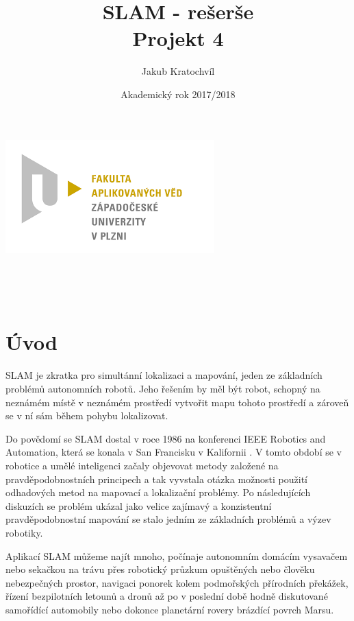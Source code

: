 \documentclass[12pt,a4paper]{article}
\begin{document}
\title{SLAM - rešerše \\ Projekt 4}
\author{Jakub Kratochvíl}
\date{Akademický rok 2017/2018}
\begin{titlepage}
\begin{center}
\includegraphics[scale=0.5]{img/logo_zcu.png}\\
\vspace{5cm}
\begin{Large}
\textbf{\thetitle}\\
\end{Large}
\vspace{3cm}
\theauthor\\
\vspace{5cm}
\thedate
\end{center}
\end{titlepage}
\newpage
		
		
\tableofcontents
\newpage
\fontsize{12pt}{18pt}\selectfont


\section{Úvod}
SLAM je zkratka pro simultánní lokalizaci a mapování, jeden ze základních problémů autonomních robotů. Jeho řešením by měl být robot, schopný na neznámém místě v neznámém prostředí vytvořit mapu tohoto prostředí a zároveň se v ní sám během pohybu lokalizovat.

Do povědomí se SLAM dostal v roce 1986 na konferenci IEEE Robotics and Automation, která se konala v San Francisku v Kalifornii \cite{Durrant-Whyte}. V tomto období se v robotice a umělé inteligenci začaly objevovat metody založené na pravděpodobnostních principech a tak vyvstala otázka možnosti použití odhadových metod na mapovací a lokalizační problémy. Po následujících diskuzích se problém ukázal jako velice zajímavý a konzistentní pravděpodobnostní mapování se stalo jedním ze základních problémů a výzev robotiky.

Aplikací SLAM můžeme najít mnoho, počínaje autonomním domácím vysavačem nebo sekačkou na trávu přes robotický průzkum opuštěných nebo člověku nebezpečných prostor, navigaci ponorek kolem podmořských přírodních překážek, řízení bezpilotních letounů a dronů až po v poslední době hodně diskutované samořídící automobily nebo dokonce planetární rovery brázdící povrch Marsu.
\end{document}
